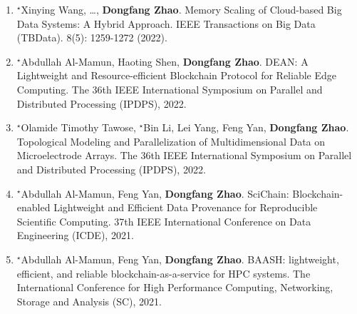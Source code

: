 \documentclass[11pt]{scrartcl}
\begin{document}
\begin{enumerate}



\item $^\star$Xinying Wang, \dots, \textbf{Dongfang Zhao}. 
Memory Scaling of Cloud-based Big Data Systems: A Hybrid Approach.
IEEE Transactions on Big Data (TBData). 8(5): 1259-1272 (2022).

\item 	$^\star$Abdullah Al-Mamun, Haoting Shen, \textbf{Dongfang Zhao}.
DEAN: A Lightweight and Resource-efficient Blockchain Protocol for Reliable Edge Computing. 
The 36th IEEE International Symposium on Parallel and Distributed Processing (IPDPS), 2022.

\item 	$^\star$Olamide Timothy Tawose, $^\star$Bin Li, Lei Yang, Feng Yan, \textbf{Dongfang Zhao}.
Topological Modeling and Parallelization of Multidimensional Data on Microelectrode Arrays. 
The 36th IEEE International Symposium on Parallel and Distributed Processing (IPDPS), 2022.

\item $^\star$Abdullah Al-Mamun, Feng Yan, \textbf{Dongfang Zhao}.
SciChain: Blockchain-enabled Lightweight and Efficient Data Provenance for Reproducible Scientific Computing. 37th IEEE International Conference on Data Engineering (ICDE), 2021.

\item $^\star$Abdullah Al-Mamun, Feng Yan, \textbf{Dongfang Zhao}.
BAASH: lightweight, efficient, and reliable blockchain-as-a-service for HPC systems. The International Conference for High Performance Computing, Networking, Storage and Analysis (SC), 2021.


\end{enumerate}
\end{document}
